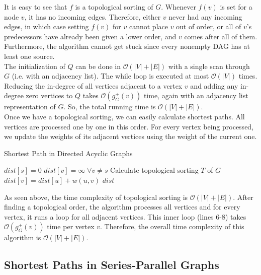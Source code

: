 \documentclass[]{article}
\numberwithin{equation}{section}
\begin{document}
It is easy to see that $f$ is a topological sorting of $G$. Whenever $f(v)$ is set for a node $v$, it has no incoming edges. Therefore, either $v$ never had any incoming edges, in which case setting $f(v)$ for $v$ cannot place $v$ out of order, or all of $v$'s predecessors have already been given a lower order, and $v$ comes after all of them. Furthermore, the algorithm cannot get stuck since every nonempty DAG has at least one source.\\

The initialization of $Q$ can be done in $\mathcal{O}(|V|+|E|)$ with a single scan through $G$ (i.e. with an adjacency list). The while loop is executed at most $\mathcal{O}(|V|)$ times. Reducing the in-degree of all vertices adjacent to a vertex $v$ and adding any in-degree zero vertices to $Q$ takes $\mathcal{O}(g^+_G(v))$ time, again with an adjacency list representation of $G$. So, the total running time is $\mathcal{O}(|V|+|E|)$.\\

Once we have a topological sorting, we can easily calculate shortest paths. All vertices are processed one by one in this order. For every vertex being processed, we update the weights of its adjacent vertices using the weight of the current one.

\begin{algorithm}[H]
	\caption{Shortest Path in Directed Acyclic Graphs}
	\label{alg:spdag}
	\begin{algorithmic}[1]
		\State $dist[s]=0$
		\State $dist[v]=\infty\; \forall v\neq s$
		\State Calculate topological sorting $T$ of $G$
				\State $dist[v]=dist[u]+w(u,v)$
				\EndIf
			\EndFor
		\EndFor
		\State\Return $dist$
		\EndProcedure
	\end{algorithmic}
\end{algorithm}

As seen above, the time complexity of topological sorting is $\mathcal{O}(|V|+|E|)$. After finding a topological order, the algorithm processes all vertices and for every vertex, it runs a loop for all adjacent vertices. This inner loop (lines 6-8) takes $\mathcal{O}(g^+_G(v))$ time per vertex $v$. Therefore, the overall time complexity of this algorithm is $\mathcal{O}(|V|+|E|)$.

\subsection{Shortest Paths in Series-Parallel Graphs}
\label{sec:unlabeled:spg}
\end{document}
